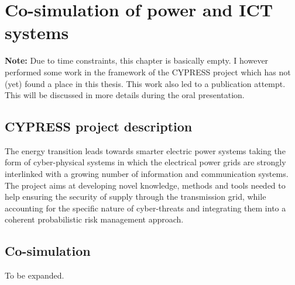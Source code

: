 \chapter{Co-simulation of power and ICT systems}
\label{ch:cosim}
\minitoc

\textbf{Note:} Due to time constraints, this chapter is basically empty. I however performed some work in the framework of the CYPRESS project which has not (yet) found a place in this thesis. This work also led to a publication attempt. This will be discussed in more details during the oral presentation.

\section{CYPRESS project description}

The energy transition leads towards smarter electric power systems taking the form of cyber-physical systems in which the electrical power grids are strongly interlinked with a growing number of information and communication systems. The project aims at developing novel knowledge, methods and tools needed to help ensuring the security of supply through the transmission grid, while accounting for the specific nature of cyber-threats and integrating them into a coherent probabilistic risk management approach.

\section{Co-simulation}

To be expanded.




